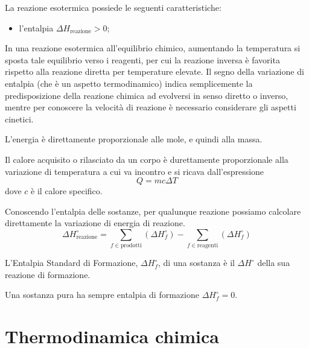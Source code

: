 \documentclass[a4paper]{article}
\begin{document}

La reazione esotermica possiede le seguenti caratteristiche:
\begin{itemize}
    \item l'entalpia \(\Delta H_{\text{reazione}} > 0\);
\end{itemize}

In una reazione esotermica all'equilibrio chimico,
aumentando la temperatura si sposta tale equilibrio verso i reagenti,
per cui la reazione inversa è favorita rispetto alla reazione diretta
per temperature elevate. Il segno della variazione di entalpia
(che è un aspetto termodinamico) indica semplicemente la predisposizione della
reazione chimica ad evolversi in senso diretto o inverso,
mentre per conoscere la velocità di reazione è necessario considerare gli aspetti cinetici.

L'energia è direttamente proporzionale alle mole, e quindi alla massa.

Il calore acquisito o rilasciato da un corpo è durettamente proporzionale
alla variazione di temperatura a cui va incontro e si ricava dall'espressione
\[
    Q = mc\Delta T
\]
dove \(c\) è il calore specifico.


Conoscendo l'entalpia delle sostanze, per qualunque
reazione possiamo calcolare direttamente la variazione di energia di reazione.
\[
    \Delta H^\circ_{\text{reazione}} =
    \sum_{f \in \text{prodotti}} \left( \Delta H^\circ_f \right) -
    \sum_{f \in \text{reagenti}} \left( \Delta H^\circ_f \right) 
\]

L'Entalpia Standard di Formazione,
\(\Delta H^\circ_f\), di una sostanza è il \(\Delta H^\circ\)
della sua reazione di formazione.

Una sostanza pura ha sempre entalpia di formazione \(\Delta H^\circ_f = 0\).

\pagebreak

\section{Thermodinamica chimica}
\end{document}
